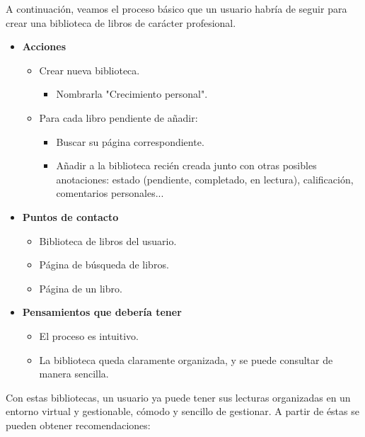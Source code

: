 A continuación, veamos el proceso básico que un usuario habría de seguir para crear una biblioteca de libros de carácter profesional.

\begin{itemize}
    \item \textbf{Acciones}
    \begin{itemize}
        \item Crear nueva biblioteca.
        \begin {itemize}
            \item Nombrarla "Crecimiento personal".
        \end{itemize}
        \item Para cada libro pendiente de añadir:
        \begin{itemize}
            \item Buscar su página correspondiente.
            \item Añadir a la biblioteca recién creada junto con otras posibles anotaciones: estado (pendiente, completado, en lectura), calificación, comentarios personales...
        \end{itemize}
    \end{itemize}
    \item \textbf{Puntos de contacto}
    \begin{itemize}
        \item Biblioteca de libros del usuario.
        \item Página de búsqueda de libros.
        \item Página de un libro.
    \end{itemize}
    \item \textbf{Pensamientos que debería tener}
    \begin{itemize}
        \item El proceso es intuitivo.
        \item La biblioteca queda claramente organizada, y se puede consultar de manera sencilla.
    \end{itemize}
\end{itemize}

Con estas bibliotecas, un usuario ya puede tener sus lecturas organizadas en un entorno virtual y gestionable, cómodo y sencillo de gestionar. A partir de éstas se pueden obtener recomendaciones:

